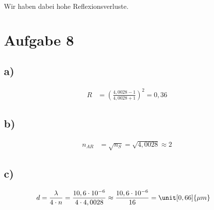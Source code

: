 Wir haben dabei hohe Reflexionsverluste.


\section{Aufgabe 8}

\subsection*{a)}

\begin{align*}
R &= \left( \frac{4,0028 - 1}{4,0028 + 1} \right)^2 = 0,36
\end{align*}

\subsection*{b)}

\begin{align*}
n_{AR} &= \sqrt{n_S} = \sqrt{4,0028} \approx 2
\end{align*}

\subsection*{c)}

\begin{align*}
d &= \frac{\lambda}{4 \cdot n} = \frac{10,6 \cdot 10^{-6}}{4 \cdot 4,0028} \approx \frac{10,6 \cdot 10^{-6}}{16} = \unit[0,66]{\mu m}
\end{align*}






